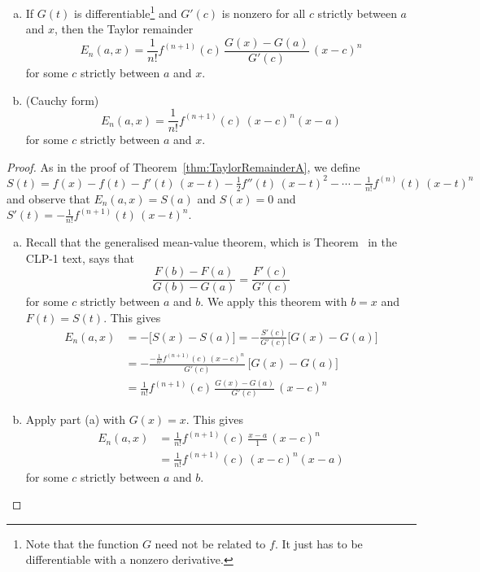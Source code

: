 \begin{theorem}
           \label{thm:TaylorRemainderB}
\begin{enumerate}[(a)]
\item
If $G(t)$ is differentiable\footnote{Note that the function $G$ need not be related to $f$. It just has to be differentiable with a nonzero derivative.} and $G'(c)$ is nonzero for all $c$ strictly 
between $a$ and $x$, then the Taylor remainder
\begin{equation*}
E_n(a,x)=\frac{1}{n!} f^{(n+1)}(c)\,\frac{G(x)-G(a)}{G'(c)}\, (x-c)^n
\end{equation*} 
for some $c$ strictly between $a$ and $x$.

\item  (Cauchy form) 
\begin{equation*}
E_n(a,x)=\frac{1}{n!}f^{(n+1)}(c)\, (x-c)^n(x-a)
\end{equation*} 
for some $c$ strictly between $a$ and $x$.
\end{enumerate}
\end{theorem}
\begin{proof}
As in the proof of Theorem~\ref{thm:TaylorRemainderA}, we define
\begin{equation*}
S(t) = f(x) - f(t) -f'(t)\,(x-t)-\tfrac{1}{2}f''(t)\,(x-t)^2
                      -\cdots-\tfrac{1}{n!}f^{(n)}(t)\, (x-t)^n
\end{equation*}
and observe that $E_n(a,x) = S(a)$ and $S(x)=0$ and
$S'(t)= -\tfrac{1}{n!}  f^{(n+1)}(t)\,(x-t)^n$.
\begin{enumerate}[(a)]
\item
Recall that the generalised mean-value theorem, which 
is Theorem~ in the CLP-1 text, says that
\begin{equation*}
\frac{F(b)-F(a)}{G(b)-G(a)} = \frac{F'(c)}{G'(c)}
\tag{GMVT}\end{equation*}
for some $c$ strictly between $a$ and $b$. We apply this theorem with
$b=x$ and $F(t)=S(t)$. This gives
\begin{align*}
E_n(a,x)
&= -\big[S(x)-S(a)\big] =-\frac{S'(c)}{G'(c)}\big[G(x)-G(a)\big] \\
&=-\frac{ -\frac{1}{n!}  f^{(n+1)}(c)\,(x-c)^n}{G'(c)}\ \big[G(x)-G(a)\big]\\
&=\frac{1}{n!} f^{(n+1)}(c)\,\frac{G(x)-G(a)}{G'(c)}\, (x-c)^n
\end{align*}

\item
Apply part (a) with $G(x)=x$. This gives
\begin{align*}
E_n(a,x)
&=\frac{1}{n!} f^{(n+1)}(c)\,\frac{x-a}{1}\, (x-c)^n \\
&=\frac{1}{n!} f^{(n+1)}(c)\, (x-c)^n(x-a)
\end{align*}
for some $c$ strictly between $a$ and $b$. 
\end{enumerate}
\end{proof}

